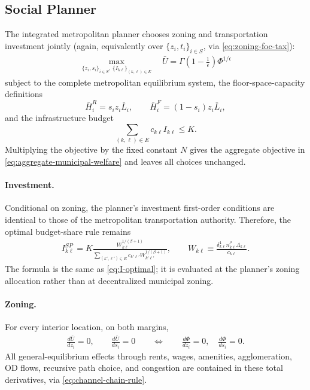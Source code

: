 \documentclass[12pt, a4paper]{article}
\theoremstyle{definition}
\theoremstyle{remark}
\begin{document}
\subsection{Social Planner}

The integrated metropolitan planner chooses zoning and transportation investment jointly (again, equivalently over $\{z_i,t_i\}_{i\in S}$, via \eqref{eq:zoning-foc-tax}):
\begin{align}
    \label{eq:SP-problem}
    \max_{\{z_i,s_i\}_{i\in S},\,\{I_{k\ell}\}_{(k,\ell)\in E}}
    \quad
    \bar U
    =
    \Gamma\!\left(1-\tfrac1\epsilon\right)\Phi^{1/\epsilon}
\end{align}
subject to the complete metropolitan equilibrium system, the floor-space-capacity definitions
\[
\bar H_i^R=s_iz_i\bar L_i,
\qquad
\bar H_i^F=(1-s_i)z_i\bar L_i,
\]
and the infrastructure budget
\[
\sum_{(k,\ell)\in E}c_{k\ell}I_{k\ell}\leq K.
\]
Multiplying the objective by the fixed constant $N$ gives the aggregate objective in \eqref{eq:aggregate-municipal-welfare} and leaves all choices unchanged.

\paragraph{Investment.}
Conditional on zoning, the planner's investment first-order conditions are identical to those of the metropolitan transportation authority. Therefore, the optimal budget-share rule remains
\begin{align}
    \label{eq:I-optimal-SP}
    I_{k\ell}^{SP}
    =
    K
    \frac{
    W_{k\ell}^{1/(\beta+1)}
    }{
    \displaystyle
    \sum_{(k',\ell')\in E}
    c_{k'\ell'}
    W_{k'\ell'}^{1/(\beta+1)}
    },
    \qquad
    W_{k\ell}
    \equiv
    \frac{
    \delta_{k\ell}^1n_{k\ell}^{\rho}\Lambda_{k\ell}
    }{
    c_{k\ell}
    }.
\end{align}
The formula is the same as \eqref{eq:I-optimal}; it is evaluated at the planner's zoning allocation rather than at decentralized municipal zoning.

\paragraph{Zoning.}
For every interior location, on both margins,
\begin{align}
    \label{zoning-foc-planner}
    \frac{d\bar U}{dz_i}=0,
    \qquad
    \frac{d\bar U}{ds_i}=0
    \qquad\Longleftrightarrow\qquad
    \frac{d\Phi}{dz_i}=0,
    \quad
    \frac{d\Phi}{ds_i}=0.
\end{align}
All general-equilibrium effects through rents, wages, amenities, agglomeration, OD flows, recursive path choice, and congestion are contained in these total derivatives, via \eqref{eq:channel-chain-rule}.
\end{document}
